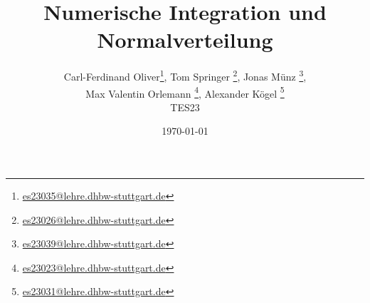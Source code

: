 \documentclass[11pt,a4paper]{scrartcl}
\begin{document}
%
\titlehead{\texttt{[image: dhbw.pdf]}}
\title{Numerische Integration und Normalverteilung}
\author{Carl-Ferdinand Oliver\thanks{\href{mailto:es23035@lehre.dhbw-stuttgart.de}{es23035@lehre.dhbw-stuttgart.de}}, Tom Springer \thanks{\href{mailto:es23026@lehre.dhbw-stuttgart.de}{es23026@lehre.dhbw-stuttgart.de}}, Jonas Münz \thanks{\href{mailto:es23039@lehre.dhbw-stuttgart.de}{es23039@lehre.dhbw-stuttgart.de}}, \\ Max Valentin Orlemann \thanks{\href{mailto:es23023@lehre.dhbw-stuttgart.de}{es23023@lehre.dhbw-stuttgart.de}}, Alexander Kögel \thanks{\href{mailto:es23031@lehre.dhbw-stuttgart.de}{es23031@lehre.dhbw-stuttgart.de}}\\TES23}
\date{\today}
\maketitle
\vfill

\thispagestyle{empty}
%
%
\tableofcontents
\thispagestyle{empty}
\cleardoublepage
{} 
\newpage
%
%







%
\printbibliography[]
\vfill
\end{document}
